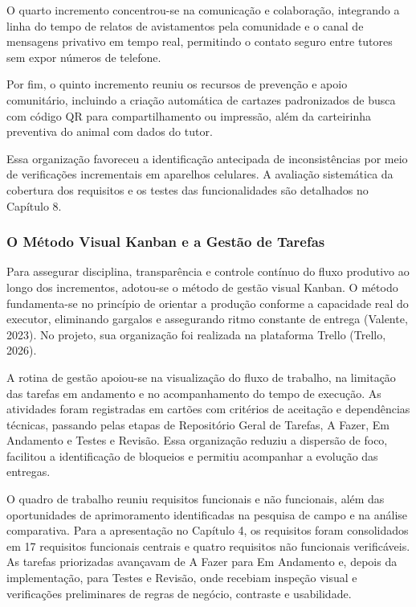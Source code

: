 O quarto incremento concentrou-se na comunicação e colaboração, integrando a linha do tempo de relatos de avistamentos pela comunidade e o canal de mensagens privativo em tempo real, permitindo o contato seguro entre tutores sem expor números de telefone.

Por fim, o quinto incremento reuniu os recursos de prevenção e apoio comunitário, incluindo a criação automática de cartazes padronizados de busca com código QR para compartilhamento ou impressão, além da carteirinha preventiva do animal com dados do tutor.

Essa organização favoreceu a identificação antecipada de inconsistências por meio de verificações incrementais em aparelhos celulares. A avaliação sistemática da cobertura dos requisitos e os testes das funcionalidades são detalhados no Capítulo 8.


\subsubsection{O Método Visual Kanban e a Gestão de Tarefas}

Para assegurar disciplina, transparência e controle contínuo do fluxo produtivo ao longo dos incrementos, adotou-se o método de gestão visual Kanban. O método fundamenta-se no princípio de orientar a produção conforme a capacidade real do executor, eliminando gargalos e assegurando ritmo constante de entrega (Valente, 2023). No projeto, sua organização foi realizada na plataforma Trello (Trello, 2026).

A rotina de gestão apoiou-se na visualização do fluxo de trabalho, na limitação das tarefas em andamento e no acompanhamento do tempo de execução. As atividades foram registradas em cartões com critérios de aceitação e dependências técnicas, passando pelas etapas de Repositório Geral de Tarefas, A Fazer, Em Andamento e Testes e Revisão. Essa organização reduziu a dispersão de foco, facilitou a identificação de bloqueios e permitiu acompanhar a evolução das entregas.

O quadro de trabalho reuniu requisitos funcionais e não funcionais, além das oportunidades de aprimoramento identificadas na pesquisa de campo e na análise comparativa. Para a apresentação no Capítulo 4, os requisitos foram consolidados em 17 requisitos funcionais centrais e quatro requisitos não funcionais verificáveis. As tarefas priorizadas avançavam de A Fazer para Em Andamento e, depois da implementação, para Testes e Revisão, onde recebiam inspeção visual e verificações preliminares de regras de negócio, contraste e usabilidade.


